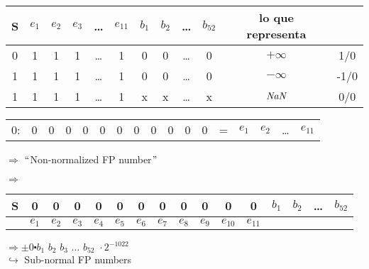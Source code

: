 \vspace{3mm}

\begin{center}
\begin{tabular}{c|c c c c c|c c c c|c|c|}
S & $e_{1}$  & $e_{2}$ & $e_{3}$ & \ldots & $e_{11}$ & $b_{1}$ & $b_{2}$ & \ldots & $b_{52}$ & lo que representa & \\ 
\hline
0 & 1 & 1 & 1 & \ldots & 1 & 0 & 0 & \ldots & 0 & $+\infty$ & 1/0 \\ 
1 & 1 & 1 & 1 & \ldots & 1 & 0 & 0 & \ldots & 0 & $-\infty$ & -1/0 \\ 
1 & 1 & 1 & 1 & \ldots & 1 & x & x & \ldots & x & $\emph{NaN}$ & 0/0 \\ 
\end{tabular} 
\end{center}

\vspace{3mm}

\begin{center}
\begin{tabular}{c c c c c c c c c c c c c c c c c}
0: & 0 & 0 & 0 & 0 & 0 & 0 & 0 & 0 & 0 & 0 & 0 & = & $e_{1}$ & $e_{2}$ & \ldots & $e_{11}$\\
\end{tabular}

\vspace{3mm}

$\Rightarrow$ $``$Non-normalized FP number$"$\\

\vspace{5mm}

$\Rightarrow$
\begin{tabular}{c|c c c c c c c c c c c| c c c c}
S & 0 & 0 & 0 & 0 & 0 & 0 & 0 & 0 & 0 & 0 & 0  & $b_{1}$ & $b_{2}$ & \ldots & $b_{52}$\\
\hline
  & $e_{1}$  & $e_{2}$ & $e_{3}$ & $e_{4}$ & $e_{5}$ & $e_{6}$ & $e_{7}$ & $e_{8}$ & $e_{9}$ & $e_{10}$ & $e_{11}$ & & & & \\
\end{tabular} 
\end{center}

\vspace{5mm}
\begin{center}
$\Rightarrow \pm 0\centerdot b_{1}\,\,b_{2}\,\,b_{3}\,\,\ldots\,\,b_{52}\,\,\cdot 2^{-1022}$\\
\hspace{2.5cm}$\hookrightarrow$ Sub-normal FP numbers
\end{center}

